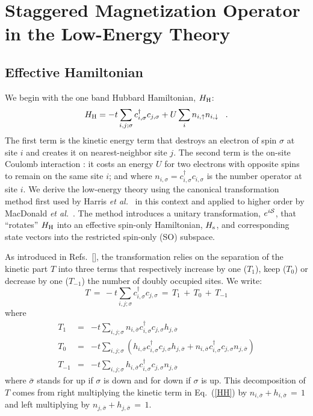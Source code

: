 \documentclass[aps,prb,twocolumn,superscriptaddress,
               amsmath]{revtex4}
\newcommand{\eqn}[1]{\vspace{-0.cm}\begin{equation}
#1
\end{equation}}
\renewcommand{\=}{\,=\,}
\newcommand{\+}{\,+\,}
\renewcommand{\-}{\,-\,}
\begin{document}
\section{Staggered Magnetization Operator in the Low-Energy Theory}



\subsection{Effective Hamiltonian}

We begin with the one band Hubbard Hamiltonian, $H_{\rm H}$:
\begin{equation}
H_{\rm H}= -t \sum_{i,j;\sigma}
c^\dagger_{i,\sigma}c_{j,\sigma}
+U\sum_i n_{i,\uparrow}n_{i,\downarrow} \;\;\; .
\label{HH}
\end{equation}
The first term is the kinetic energy term that destroys an
electron of spin $\sigma$ at site $i$ and creates it on
nearest-neighbor site $j$. The second term is the on-site Coulomb
interaction : it costs an energy $U$ for two electrons with
opposite spins to remain on the same site $i$; and where
$n_{i,\sigma}=c^\dagger_{i,\sigma}c_{i,\sigma}$ is the number
operator at site $i$. 
We derive the low-energy theory using the canonical transformation method
first used by Harris {\it et al.}~\cite{Harris}
in this context and applied to higher order by MacDonald 
{\it et al.}~\cite{MacDonald}.
The method introduces a
unitary transformation, $e^{i{\cal S}}$, that ``rotates'' $H_{\rm
H}$ into an effective spin-only Hamiltonian, $H_{\rm s}$, and
corresponding state vectors into the restricted spin-only (SO)
subspace.

As introduced in Refs.~[], the transformation
relies on the separation of the kinetic part $T$ into three
terms that respectively increase by one ($T_1$), keep ($T_0$)
or decrease by one ($T_{-1}$) the number of doubly occupied sites.
We write:
\eqn{
T\,=\,-t \sum_{i,j;\sigma}
c^\dagger_{i,\sigma}c_{j,\sigma}
 \,=\,T_1\,+\,T_0\,+\,T_{-1}
}
where
\begin{eqnarray}
T_1 &= &-t \sum_{i,j;\sigma}
n_{i,\bar{\sigma}}  c^\dagger_{i,\sigma}c_{j,\sigma} h_{j,\bar{\sigma}} \\
T_{0}&=&-t \sum_{i,j;\sigma}
\!\left ( h_{i,\bar{\sigma}}  c^\dagger_{i,\sigma}c_{j,\sigma} h_{j,\bar{\sigma}}
  + n_{i,\bar{\sigma}}  c^\dagger_{i,\sigma}c_{j,\sigma}
n_{j,\bar{\sigma}}\right) \\
T_{-1}&=&-t \sum_{i,j;\sigma}
 h_{i,\bar{\sigma}}  c^\dagger_{i,\sigma}c_{j,\sigma} n_{j,\bar{\sigma}}
\end{eqnarray}
where $\bar{\sigma}$ stands for up if ${\sigma}$ is down
and for down if $\sigma$ is up.
This decomposition of $T$ comes from right
multiplying the kinetic term in Eq.~(\ref{HH}) by
$n_{i,\bar{\sigma}} + h_{i,\bar{\sigma}} \,=\,1$
and left multiplying by $n_{j,\bar{\sigma}} + h_{j,\bar{\sigma}} \,=\,1$.
\end{document}
